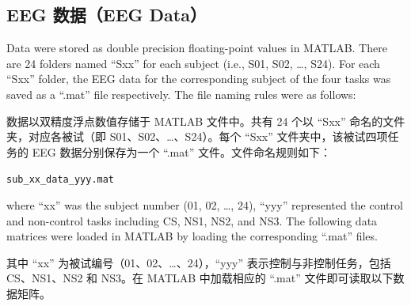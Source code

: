 \documentclass[11pt]{ctexart}
\newenvironment{en}{\begin{enbox}\color{black!85}}{\end{enbox}}
\newenvironment{zh}{\begin{zhbox}}{\end{zhbox}}
\begin{document}
\subsection{EEG 数据（EEG Data）}
\begin{en}
Data were stored as double precision floating-point values in MATLAB. There are 24 folders named ``Sxx'' for each subject (i.e., S01, S02, \ldots, S24). For each ``Sxx'' folder, the EEG data for the corresponding subject of the four tasks was saved as a ``.mat'' file respectively. The file naming rules were as follows:
\end{en}
\begin{zh}
数据以双精度浮点数值存储于 MATLAB 文件中。共有 24 个以 ``Sxx'' 命名的文件夹，对应各被试（即 S01、S02、\ldots、S24）。每个 ``Sxx'' 文件夹中，该被试四项任务的 EEG 数据分别保存为一个 ``.mat'' 文件。文件命名规则如下：
\end{zh}

\begin{center}
\texttt{sub\_xx\_data\_yyy.mat}
\end{center}

\begin{en}
where ``xx'' was the subject number (01, 02, \ldots, 24), ``yyy'' represented the control and non-control tasks including CS, NS1, NS2, and NS3. The following data matrices were loaded in MATLAB by loading the corresponding ``.mat'' files.
\end{en}
\begin{zh}
其中 ``xx'' 为被试编号（01、02、\ldots、24），``yyy'' 表示控制与非控制任务，包括 CS、NS1、NS2 和 NS3。在 MATLAB 中加载相应的 ``.mat'' 文件即可读取以下数据矩阵。
\end{zh}
\end{document}
